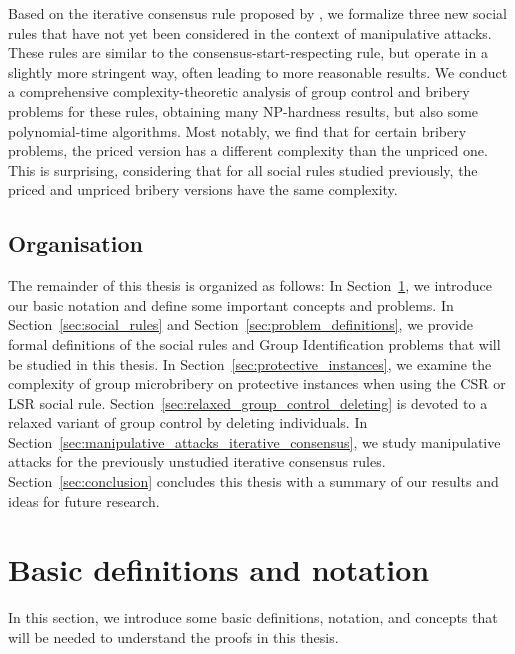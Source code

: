 \documentclass[
    12pt,               %
    a4paper,            %
    bibtotoc,           %
    pointlessnumbers,   %
    ngerman,            %
    titlepage,          %
    leqno,              %
    ]{scrarticle}       %
\newcommand\secref{Section~\ref}
\begin{document}
Based on the iterative consensus rule proposed by \textcite{KR97}, we formalize three new social rules that have not yet been considered in the context of manipulative attacks. These rules are similar to the consensus-start-respecting rule, but operate in a slightly more stringent way, often leading to more reasonable results. We conduct a comprehensive complexity-theoretic analysis of group control and bribery problems for these rules, obtaining many NP-hardness results, but also some polynomial-time algorithms. Most notably, we find that for certain bribery problems, the priced version has a different complexity than the unpriced one. This is surprising, considering that for all social rules studied previously, the priced and unpriced bribery versions have the same complexity.



\subsection{Organisation}
\label{sec:intro_organization}

The remainder of this thesis is organized as follows: In \secref{sec:basic_definitions}, we introduce our basic notation and define some important concepts and problems. In \secref{sec:social_rules} and \secref{sec:problem_definitions}, we provide formal definitions of the social rules and Group Identification problems that will be studied in this thesis. In \secref{sec:protective_instances}, we examine the complexity of group microbribery on protective instances when using the CSR or LSR social rule. \secref{sec:relaxed_group_control_deleting} is devoted to a relaxed variant of group control by deleting individuals. In \secref{sec:manipulative_attacks_iterative_consensus}, we study manipulative attacks for the previously unstudied iterative consensus rules. \secref{sec:conclusion} concludes this thesis with a summary of our results and ideas for future research.









\clearpage

\section{Basic definitions and notation}
\label{sec:basic_definitions}

In this section, we introduce some basic definitions, notation, and concepts that will be needed to understand the proofs in this thesis.
\end{document}
